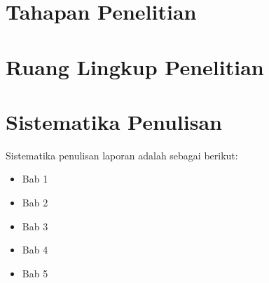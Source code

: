 \paragraph{}

\section{Tahapan Penelitian}
\section{Ruang Lingkup Penelitian}

\section{Sistematika Penulisan}
Sistematika penulisan laporan adalah sebagai berikut:
\begin{itemize}
	\item Bab 1 \babSatu \\
	\item Bab 2 \babDua \\
	\item Bab 3 \babTiga \\
	\item Bab 4 \babEmpat \\
	\item Bab 5 \babLima \\
\end{itemize}

